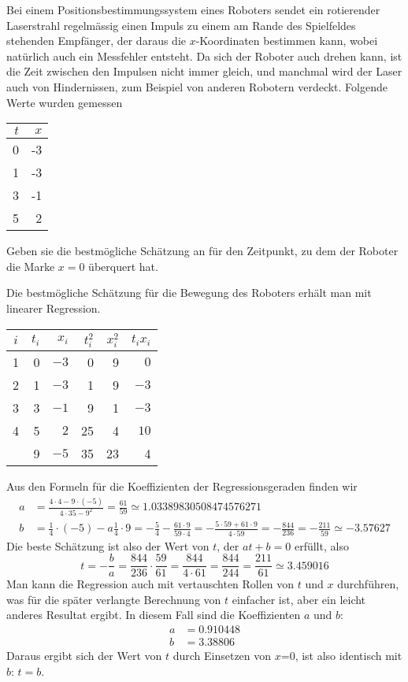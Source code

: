 Bei einem Positionsbestimmungssystem eines Roboters sendet ein rotierender
Laserstrahl regelmässig einen Impuls zu einem am Rande des Spielfeldes
stehenden Empfänger, der daraus die $x$-Koordinaten bestimmen kann,
wobei natürlich auch ein Messfehler entsteht.
Da sich der Roboter auch drehen kann, ist die Zeit zwischen den Impulsen
nicht immer gleich, und manchmal wird der Laser auch von Hindernissen, zum
Beispiel von anderen Robotern verdeckt. Folgende Werte wurden gemessen
\begin{center}
\begin{tabular}{|r|r|}
\hline
$t$&$x$\\
\hline
0&-3\\
1&-3\\
3&-1\\
5&2\\
\hline
\end{tabular}
\end{center}
Geben sie die bestmögliche Schätzung an für den Zeitpunkt,
zu dem der Roboter die Marke $x=0$ überquert hat.

\begin{loesung}
Die bestmögliche Schätzung für die Bewegung des Roboters erhält
man mit linearer Regression.
\begin{center}
\begin{tabular}{|c|rr|rr|r|}
\hline
$i$&$t_i$&$x_i$&$t_i^2$&$x_i^2$&$t_ix_i$\\
\hline
1&0&$-3$& 0&9&$ 0$\\
2&1&$-3$& 1&9&$-3$\\
3&3&$-1$& 9&1&$-3$\\
4&5&$ 2$&25&4&$10$\\
\hline
&9&$-5$&35&23&4\\
\hline
\end{tabular}
\end{center}
Aus den Formeln für die Koeffizienten der Regressionsgeraden finden
wir
\begin{align*}
a&=\frac{4\cdot 4 -9\cdot(-5)}{4\cdot 35-9^2}=\frac{61}{59}
\simeq 1.03389830508474576271
\\
b&=\frac14\cdot (-5)-a\frac14\cdot 9
=-\frac54-\frac{61\cdot 9}{59\cdot 4}
=-\frac{5\cdot 59+61\cdot 9}{4\cdot 59}
=-\frac{844}{236}
=-\frac{211}{59}
\simeq
-3.57627
\end{align*}
Die beste Schätzung ist also der Wert von $t$, der
$at+b=0$ erfüllt, also
\[
t=-\frac{b}{a}=\frac{844}{236}\cdot\frac{59}{61}
=\frac{844}{4\cdot 61}=\frac{844}{244}
=\frac{211}{61}
\simeq 3.459016
\]
Man kann die Regression auch mit vertauschten Rollen von $t$ und $x$
durchführen, was für die später verlangte Berechnung von $t$
einfacher ist, aber ein leicht anderes Resultat ergibt. In diesem
Fall sind die Koeffizienten $a$ und $b$:
\begin{align*}
a&=0.910448\\
b&=3.38806
\end{align*}
Daraus ergibt sich der Wert von $t$ durch Einsetzen von $x$=0, ist
also identisch mit $b$: $t=b$.
\end{loesung}

